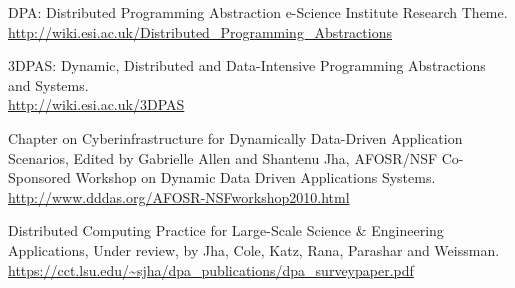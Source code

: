 \documentclass[12pt]{article}
\begin{document}
\vspace{-0.25in}
\begin{footnotesize}
\begin{thebibliography}{9}

 DPA: Distributed Programming Abstraction e-Science
  Institute Research Theme. \\
  \url{http://wiki.esi.ac.uk/Distributed_Programming_Abstractions}

 3DPAS: Dynamic, Distributed and Data-Intensive Programming
  Abstractions and Systems.  \\ \url{http://wiki.esi.ac.uk/3DPAS}


 Chapter on Cyberinfrastructure for Dynamically
  Data-Driven Application Scenarios, Edited by Gabrielle Allen and
  Shantenu Jha, AFOSR/NSF Co-Sponsored Workshop on Dynamic Data Driven
  Applications
  Systems. \url{http://www.dddas.org/AFOSR-NSFworkshop2010.html}

 Distributed Computing Practice for
  Large-Scale Science \& Engineering Applications, Under review, by
  Jha, Cole, Katz, Rana, Parashar and Weissman. \\
  \url{https://cct.lsu.edu/~sjha/dpa_publications/dpa_surveypaper.pdf}


\end{thebibliography} 
\end{footnotesize}
\end{document}
